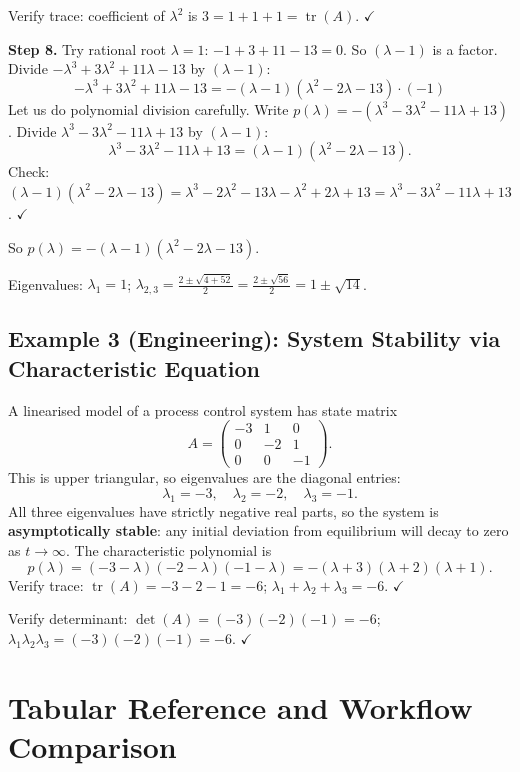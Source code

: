 \documentclass[12pt,a4paper]{article}
\begin{document}
Verify trace: coefficient of $\lambda^2$ is $3 = 1+1+1 = \operatorname{tr}(A)$. $\checkmark$

\textbf{Step 8.} Try rational root $\lambda=1$: $-1+3+11-13=0$. So $(\lambda-1)$ is a factor.
Divide $-\lambda^3+3\lambda^2+11\lambda-13$ by $(\lambda-1)$:
\[
  -\lambda^3+3\lambda^2+11\lambda-13 = -(\lambda-1)(\lambda^2-2\lambda-13) \cdot (-1)
\]
Let us do polynomial division carefully. Write $p(\lambda) = -(\lambda^3 - 3\lambda^2 - 11\lambda + 13)$.
Divide $\lambda^3-3\lambda^2-11\lambda+13$ by $(\lambda-1)$:
\[
  \lambda^3-3\lambda^2-11\lambda+13 = (\lambda-1)(\lambda^2-2\lambda-13).
\]
Check: $(\lambda-1)(\lambda^2-2\lambda-13)=\lambda^3-2\lambda^2-13\lambda-\lambda^2+2\lambda+13=\lambda^3-3\lambda^2-11\lambda+13$. $\checkmark$

So $p(\lambda) = -(\lambda-1)(\lambda^2-2\lambda-13)$.

Eigenvalues: $\lambda_1=1$; $\lambda_{2,3} = \frac{2\pm\sqrt{4+52}}{2}=\frac{2\pm\sqrt{56}}{2}=1\pm\sqrt{14}$.

\subsection*{Example 3 (Engineering): System Stability via Characteristic Equation}

A linearised model of a process control system has state matrix
\[
  A = \begin{pmatrix} -3 & 1 & 0 \\ 0 & -2 & 1 \\ 0 & 0 & -1 \end{pmatrix}.
\]
This is upper triangular, so eigenvalues are the diagonal entries:
\[
  \lambda_1 = -3, \quad \lambda_2 = -2, \quad \lambda_3 = -1.
\]
All three eigenvalues have strictly negative real parts, so the system is
\textbf{asymptotically stable}: any initial deviation from equilibrium will decay to zero
as $t\to\infty$. The characteristic polynomial is
\[
  p(\lambda) = (-3-\lambda)(-2-\lambda)(-1-\lambda) = -(\lambda+3)(\lambda+2)(\lambda+1).
\]
Verify trace: $\operatorname{tr}(A)=-3-2-1=-6$; $\lambda_1+\lambda_2+\lambda_3=-6$. $\checkmark$

Verify determinant: $\det(A)=(-3)(-2)(-1)=-6$; $\lambda_1\lambda_2\lambda_3=(-3)(-2)(-1)=-6$. $\checkmark$

\section{Tabular Reference and Workflow Comparison}
\end{document}
